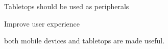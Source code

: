 

Tabletops should be used as peripherals

Improve user experience

both mobile devices and tabletops are made useful.
